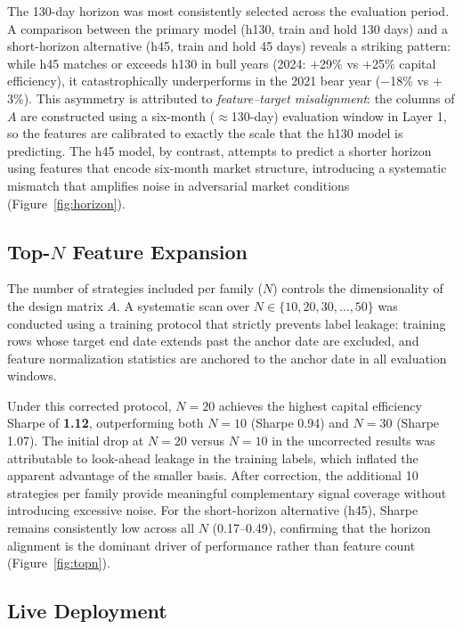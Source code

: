 \documentclass[11pt, letterpaper]{article}
\begin{document}
The 130-day horizon was most consistently selected across the evaluation
period. A comparison between the primary model (h130, train and hold 130
days) and a short-horizon alternative (h45, train and hold 45 days) reveals a
striking pattern: while h45 matches or exceeds h130 in bull years (2024:
$+$29\% vs $+$25\% capital efficiency), it catastrophically underperforms in
the 2021 bear year ($-$18\% vs $+$3\%). This asymmetry is attributed to
\emph{feature--target misalignment}: the columns of $A$ are constructed using
a six-month ($\approx$130-day) evaluation window in Layer 1, so the features
are calibrated to exactly the scale that the h130 model is predicting. The
h45 model, by contrast, attempts to predict a shorter horizon using features
that encode six-month market structure, introducing a systematic mismatch that
amplifies noise in adversarial market conditions (Figure~\ref{fig:horizon}).

\subsection{Top-$N$ Feature Expansion}

The number of strategies included per family ($N$) controls the dimensionality
of the design matrix $A$. A systematic scan over $N \in \{10, 20, 30,
\ldots, 50\}$ was conducted using a training protocol that strictly prevents
label leakage: training rows whose target end date extends past the anchor date
are excluded, and feature normalization statistics are anchored to the anchor
date in all evaluation windows.

Under this corrected protocol, $N = 20$ achieves the highest capital
efficiency Sharpe of \textbf{1.12}, outperforming both $N = 10$ (Sharpe 0.94)
and $N = 30$ (Sharpe 1.07). The initial drop at $N = 20$ versus $N = 10$
in the uncorrected results was attributable to look-ahead leakage in the
training labels, which inflated the apparent advantage of the smaller basis.
After correction, the additional 10 strategies per family provide meaningful
complementary signal coverage without introducing excessive noise. For the
short-horizon alternative (h45), Sharpe remains consistently low across all
$N$ (0.17--0.49), confirming that the horizon alignment is the dominant driver
of performance rather than feature count (Figure~\ref{fig:topn}).

\subsection{Live Deployment}
\end{document}
